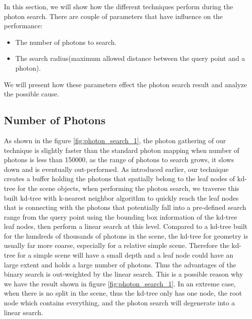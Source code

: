 In this section, we will show how the different techniques perform during the photon search. There are couple of parameters that have influence on the performance:

\begin{itemize}

\item{The number of photons to search. }

\item{The search radius(maximum allowed distance between the query point and a photon). }

\end{itemize}

We will present how these parameters effect the photon search result and analyze the possible cause.

\subsection{Number of Photons}

As shown in the figure \ref{fig:photon_search_1}, the photon gathering of our technique is slightly faster than the standard photon mapping when number of photons is less than 150000, as the range of photons to search grows, it slows down and is eventually out-performed. As introduced earlier, our technique creates a buffer holding the photons that spatially belong to the leaf nodes of kd-tree for the scene objects, when performing the photon search, we traverse this built kd-tree with k-nearest neighbor algorithm to quickly reach the leaf nodes that is connecting with the photons that potentially fall into a pre-defined search range from the query point using the bounding box information of the kd-tree leaf nodes, then perform a linear search at this level. Compared to a kd-tree built for the hundreds of thousands of photons in the scene, the kd-tree for geometry is usually far more coarse, especially for a relative simple scene. Therefore the kd-tree for a simple scene will have a small depth and a leaf node could have an large extent and holds a large number of photons. Thus the advantages of the binary search is out-weighted by the linear search. This is a possible reason why we have the result shown in figure \ref{fig:photon_search_1}. In an extreme case, when there is no split in the scene, thus the kd-tree only has one node, the root node which contains everything, and the photon search will degenerate into a linear search.

